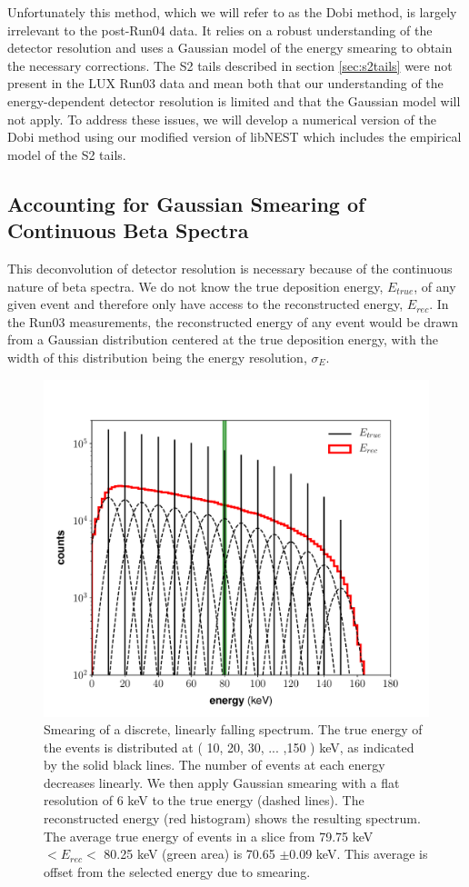 Unfortunately this method, which we will refer to as the Dobi method, is largely irrelevant to the post-Run04 data. It relies on a robust understanding of the detector resolution and uses a Gaussian model of the energy smearing to obtain the necessary corrections. The S2 tails described in section \ref{sec:s2tails} were not present in the LUX Run03 data and mean both that our understanding of the energy-dependent detector resolution is limited and that the Gaussian model will not apply. To address these issues, we will develop a numerical version of the Dobi method using our modified version of libNEST which includes the empirical model of the S2 tails. 


\subsection{Accounting for Gaussian Smearing of Continuous Beta Spectra}
This deconvolution of detector resolution is necessary because of the continuous nature of beta spectra. We do not know the true deposition energy, $E_{true}$, of any given event and therefore only have access to the reconstructed energy, $E_{rec}$. In the Run03 measurements, the reconstructed energy of any event would be drawn from a Gaussian distribution centered at the true deposition energy, with the width of this distribution being the energy resolution, $\sigma_{E}$. 
\begin{figure}[h!]
\centering
\includegraphics[width=\textwidth]{Figures/toy_smearing.pdf}
\caption{Smearing of a discrete, linearly falling spectrum. The true energy of the events is distributed at ( 10, 20, 30, ... ,150 ) keV, as indicated by the solid black lines. The number of events at each energy decreases linearly. We then apply Gaussian smearing with a flat resolution of 6 keV to the true energy (dashed lines). The reconstructed energy (red histogram) shows the resulting spectrum. The average true energy of events in a slice from 79.75 keV $<E_{rec}<$ 80.25 keV (green area) is 70.65 $\pm$0.09 keV. This average is offset from the selected energy due to smearing.}
\label{fig:toysmear}
\end{figure}

